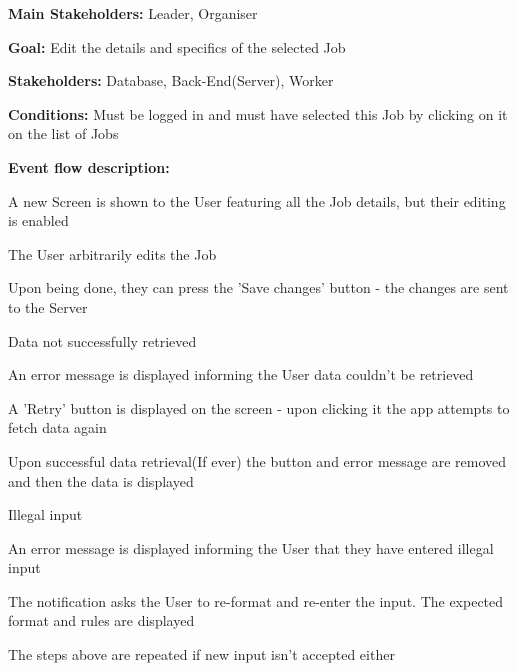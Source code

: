 				\noindent {}
				\begin{packed_item}
					\item \textbf{Main Stakeholders:} Leader, Organiser
					\item \textbf{Goal:} Edit the details and specifics of the selected Job
					\item \textbf{Stakeholders: } Database, Back-End(Server), Worker
					\item \textbf{Conditions: } Must be logged in and must have selected this Job by clicking on it on the list of Jobs
					\item \textbf{Event flow description: }
					\begin{packed_enum}
						\item A new Screen is shown to the User featuring all the Job details, but their editing is enabled
						\item The User arbitrarily edits the Job
						\item Upon being done, they can press the 'Save changes' button - the changes are sent to the Server
					\end{packed_enum}
						
					\begin{packed_item}	
						\item[1.a] Data not successfully retrieved
						\item[] \begin{packed_enum}
							\item An error message is displayed informing the User data couldn't be retrieved
							\item A 'Retry' button is displayed on the screen - upon clicking it the app attempts to fetch data again
							\item Upon successful data retrieval(If ever) the button and error message are removed and then the data is displayed
						\end{packed_enum}
					
						\item[2.a] Illegal input
						\item[] \begin{packed_enum}
							\item An error message is displayed informing the User that they have entered illegal input
							\item The notification asks the User to re-format and re-enter the input. The expected format and rules are displayed
							\item The steps above are repeated if new input isn't accepted either
						\end{packed_enum}
					

\end{packed_item}
\end{packed_item}
